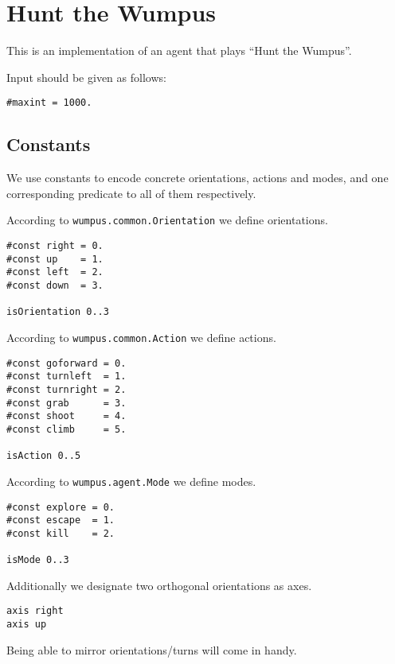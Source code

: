 \hypertarget{hunt-the-wumpus}{%
\section{Hunt the Wumpus}\label{hunt-the-wumpus}}

This is an implementation of an agent that plays ``Hunt the Wumpus''.

Input should be given as follows:

\begin{verbatim}
#maxint = 1000.
\end{verbatim}

\hypertarget{constants}{%
\subsection{Constants}\label{constants}}

We use constants to encode concrete orientations, actions and modes, and
one corresponding predicate to all of them respectively.

According to \texttt{wumpus.common.Orientation} we define orientations.

\begin{verbatim}
#const right = 0.
#const up    = 1.
#const left  = 2.
#const down  = 3.

isOrientation 0..3
\end{verbatim}

According to \texttt{wumpus.common.Action} we define actions.

\begin{verbatim}
#const goforward = 0.
#const turnleft  = 1.
#const turnright = 2.
#const grab      = 3.
#const shoot     = 4.
#const climb     = 5.

isAction 0..5
\end{verbatim}

According to \texttt{wumpus.agent.Mode} we define modes.

\begin{verbatim}
#const explore = 0.
#const escape  = 1.
#const kill    = 2.

isMode 0..3
\end{verbatim}

Additionally we designate two orthogonal orientations as axes.

\begin{verbatim}
axis right
axis up
\end{verbatim}

Being able to mirror orientations/turns will come in handy.

